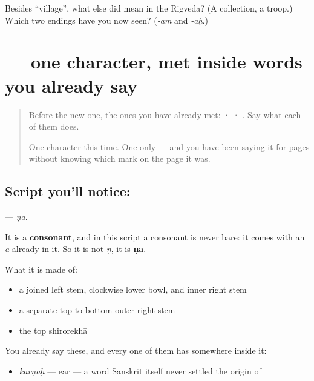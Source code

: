 \begin{tcolorbox}[breakable,colback=teal!4,colframe=teal!35!black,title={Before you move on}]
Besides \textquotedblleft{}village\textquotedblright{}, what else did  mean in the Rigveda? (A collection, a troop.) Which two endings have you now seen? (\emph{-am} and \emph{-aḥ}.)
\end{tcolorbox}
\section[\texorpdfstring{\sk{ण} (ṇa)}{ण (ṇa)}]{ — one character, met inside words you already say}

\label{lesson:SA-S217-letter-nna}



\begin{quote}
Before the new one, the ones you have already met:  ·  · . Say what each of them does.

One character this time. One only — and you have been saying it for pages without knowing which mark on the page it was.
\end{quote}

\subsection*{Script you'll notice: }
\textbf{} — \emph{ṇa}.

It is a \textbf{consonant}, and in this script a consonant is never bare: it comes with an \emph{a} already in it. So it is not \emph{ṇ}, it is \textbf{ṇa}.

What it is made of:

\begin{itemize}
\raggedright
  \item a joined left stem, clockwise lower bowl, and inner right stem
  \item a separate top-to-bottom outer right stem
  \item the top shirorekhā
\end{itemize}

You already say these, and every one of them has  somewhere inside it:

\begin{itemize}
\raggedright
  \item \textbf{} \emph{karṇaḥ} — ear — a word Sanskrit itself never settled the origin of
\end{itemize}

